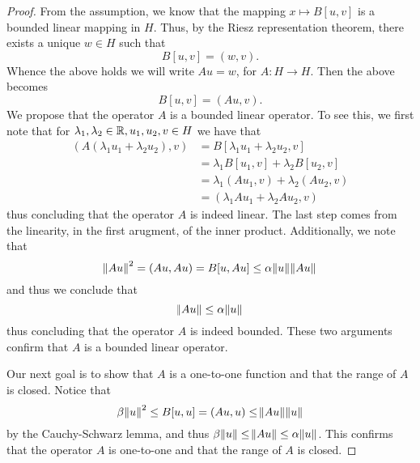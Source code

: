 \documentclass[10pt]{article}
\begin{document}
\begin{proof}
	From the assumption, we know that the mapping $x \mapsto B[u,v]$ is a bounded linear mapping in $H$. Thus, by the Riesz representation theorem, there exists a unique $w \in H$ such that
	\begin{equation*}
		\displaystyle B[u,v] = (w,v).
	\end{equation*}
	Whence the above holds we will write $Au = w$, for $A : H \to H$. Then the above becomes 
	\begin{equation}
		\label{lax-milgram theorem, extention of the Riesz representation theorem}
		\displaystyle B[u,v] = (Au,v).
	\end{equation}
	We propose that the operator $A$ is a bounded linear operator. To see this, we first note that for $\lambda_1, \lambda_2 \in \mathbb{R}, u_1, u_2, v \in H$ we have that
	\begin{align*}
		\displaystyle (A(\lambda_1 u_1 + \lambda_2 u_2), v) &= B[\lambda_1 u_1 + \lambda_2 u_2, v] \\
		&= \lambda_1 B[u_1,v] + \lambda_2 B[u_2, v] \\
		&= \lambda_1(Au_1,v) + \lambda_2(Au_2, v) \\
		&= (\lambda_1 Au_1 + \lambda_2Au_2, v)
	\end{align*}
	thus concluding that the operator $A$ is indeed linear. The last step comes from the linearity, in the first arugment, of the inner product. Additionally, we note that 
	\begin{equation*}
		\displaystyle \norm{Au}^2 = (Au, Au) = B[u, Au] \leq \alpha \norm{u}\norm{Au} 
	\end{equation*}
	and thus we conclude that 
	\begin{equation*}
		\displaystyle \norm{Au} \leq \alpha \norm{u} 
	\end{equation*}
	thus concluding that the operator $A$ is indeed bounded. These two arguments confirm that $A$ is a bounded linear operator. 
	
	Our next goal is to show that $A$ is a one-to-one function and that the range of $A$ is closed. Notice that 
	\begin{equation*}
		\displaystyle \beta\norm{u}^2 \leq B[u, u] = (Au, u) \leq \norm{Au} \norm{u}
	\end{equation*}
	by the Cauchy-Schwarz lemma, and thus $\beta \norm{u} \leq \norm{Au} \leq \alpha \norm{u}$. This confirms that the operator $A$ is one-to-one and that the range of $A$ is closed. 
\end{proof}
\end{document}
